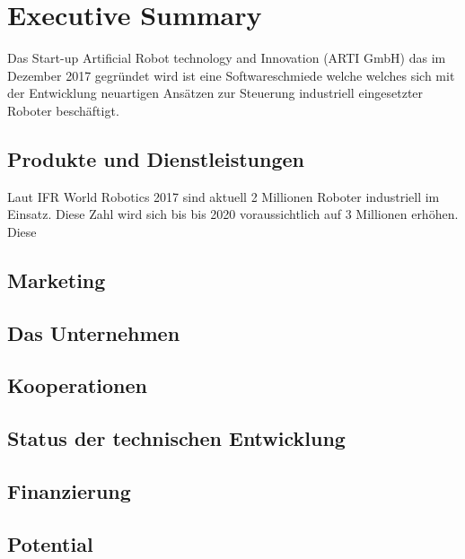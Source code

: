 \chapter{Executive Summary}

Das Start-up Artificial Robot technology and Innovation (ARTI GmbH) das im Dezember 2017 gegründet wird ist eine Softwareschmiede welche welches sich mit der Entwicklung neuartigen Ansätzen zur Steuerung industriell eingesetzter Roboter beschäftigt.

\section{Produkte und Dienstleistungen}

Laut IFR World Robotics 2017 sind aktuell 2 Millionen Roboter industriell im Einsatz. Diese Zahl wird sich bis bis 2020 voraussichtlich auf 3 Millionen erhöhen. Diese 

\section{Marketing}

\section{Das Unternehmen}

\section{Kooperationen}

\section{Status der technischen Entwicklung}

\section{Finanzierung}

\section{Potential}

\blindtext
\newpage
\blindtextkl